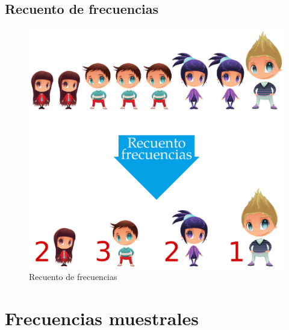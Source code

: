 \documentclass[
  a4paper,
]{scrreport}
\theoremstyle{definition}
\theoremstyle{definition}
\theoremstyle{plain}
\theoremstyle{remark}
\begin{document}
\hypertarget{recuento-de-frecuencias}{%
\subsection{Recuento de frecuencias}\label{recuento-de-frecuencias}}

\begin{figure}

{\centering \includegraphics{img/descriptiva/recuento_frecuencias.png}

}

\caption{Recuento de frecuencias}

\end{figure}

\hypertarget{frecuencias-muestrales}{%
\section{Frecuencias muestrales}\label{frecuencias-muestrales}}
\end{document}
